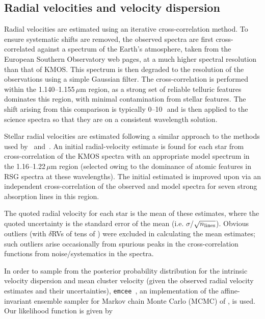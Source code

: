 \subsection{Radial velocities and velocity dispersion} %
\label{sub:radial_velocities}
Radial velocities are estimated using an iterative cross-correlation method.
To ensure systematic shifts are removed, the observed spectra are first cross-correlated against a spectrum of the Earth's atmosphere, taken from the European Southern Observatory web pages\footnotemark, at a much higher spectral resolution than that of KMOS.
This spectrum is then degraded to the resolution of the observations using a simple Gaussian filter.
The cross-correlation is performed within the 1.140--1.155\,$\mu$m region, as a strong set of reliable telluric features dominates this region, with minimal contamination from stellar features.
The shift arising from this comparison is typically 0--10\,\kms~and is then applied to the science spectra so that they are on a consistent wavelength solution.


Stellar radial velocities are estimated following a similar approach to the methods used by~\citet{2015ApJ...798...23L} and~\citet{2015ApJ...803...14P}. An initial radial-velocity estimate is found for each star from cross-correlation of the KMOS spectra with an appropriate model spectrum in the 1.16--1.22\,$\mu$m region
(selected owing to the dominance of atomic features in RSG spectra at these wavelengths).
The initial estimated is improved upon via an independent cross-correlation of the observed and model spectra for seven strong absorption lines in this region.

The quoted radial velocity for each star is the mean of these estimates, where the quoted uncertainty is the standard error of the mean
(i.e. $\sigma$/$\sqrt{n_{\rm lines}}$).
Obvious outliers (with $\delta$RVs of tens of \kms) were excluded in calculating the mean estimates; such outliers arise occasionally from spurious peaks in the cross-correlation functions from noise/systematics in the spectra.

In order to sample from the posterior probability distribution for the intrinsic velocity dispersion and mean cluster velocity (given the observed radial velocity estimates and their uncertainties), \texttt{emcee}~\citep{2013PASP..125..306F},
an implementation of the affine-invariant ensemble sampler for Markov chain Monte Carlo (MCMC) of \cite{2010CAMCS.5..65G}, is used. Our likelihood function is given by

